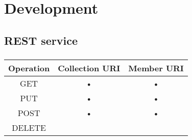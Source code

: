 \section{Development}

\subsection{REST service}

\subsubsection{}

\begin{tabular}{|c|c|c|}
\hline 
Operation & Collection URI & Member URI \\ 
\hline 
GET & • & • \\ 
\hline 
PUT & • & • \\ 
\hline 
POST & • & • \\ 
\hline
DELETE & & \\
\hline 
\end{tabular} 
